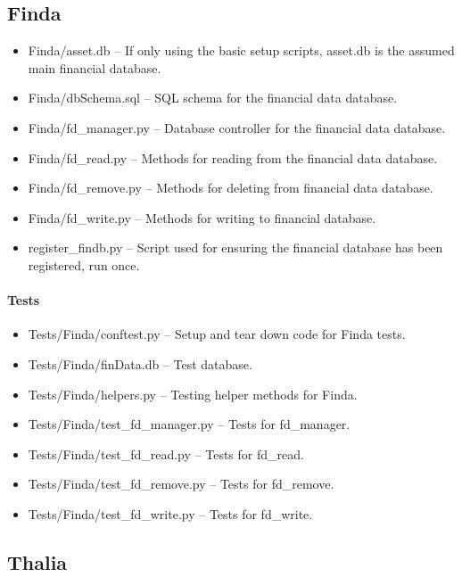 \documentclass[main.tex]{subfiles}
\begin{document}
\subsection{Finda}\label{finda}

\begin{itemize}

\item
  Finda/asset.db -- If only using the basic setup scripts, asset.db is the assumed main financial database.
\item
  Finda/dbSchema.sql -- SQL schema for the financial data database.
\item
  Finda/fd\_manager.py -- Database controller for the financial data database.
\item
  Finda/fd\_read.py -- Methods for reading from the financial data database.
\item
  Finda/fd\_remove.py -- Methods for deleting from financial data
  database.
\item
  Finda/fd\_write.py -- Methods for writing to financial database.
\item
  register\_findb.py -- Script used for ensuring the financial database has been registered, run once.
\end{itemize}

\paragraph{Tests}\label{tests-2}

\begin{itemize}

\item
  Tests/Finda/conftest.py -- Setup and tear down code for Finda tests.
\item
  Tests/Finda/finData.db -- Test database.
\item
  Tests/Finda/helpers.py -- Testing helper methods for Finda.
\item
  Tests/Finda/test\_fd\_manager.py -- Tests for fd\_manager.
\item
  Tests/Finda/test\_fd\_read.py -- Tests for fd\_read.
\item
  Tests/Finda/test\_fd\_remove.py -- Tests for fd\_remove.
\item
  Tests/Finda/test\_fd\_write.py -- Tests for fd\_write.
\end{itemize}

\subsection{Thalia}\label{thalia}
\end{document}

